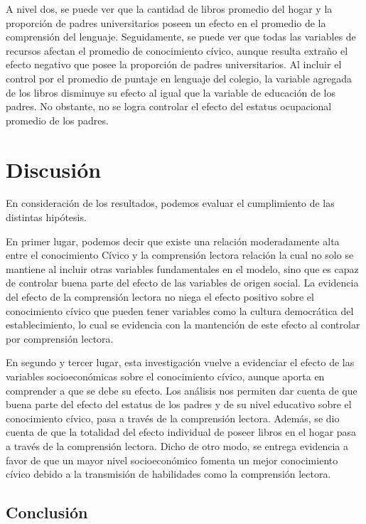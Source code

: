 \documentclass[12pt,twoside]{templates/facsothesis}
\begin{document}
A nivel dos, se puede ver que la cantidad de libros promedio del hogar y la proporción de padres universitarios poseen un efecto en el promedio de la comprensión del lenguaje. Seguidamente, se puede ver que todas las variables de recursos afectan el promedio de conocimiento cívico, aunque resulta extraño el efecto negativo que posee la proporción de padres universitarios. Al incluir el control por el promedio de puntaje en lenguaje del colegio, la variable agregada de los libros disminuye su efecto al igual que la variable de educación de los padres. No obstante, no se logra controlar el efecto del estatus ocupacional promedio de los padres.

\hypertarget{discusiuxf3n}{%
\chapter{Discusión}\label{discusiuxf3n}}

En consideración de los resultados, podemos evaluar el cumplimiento de las distintas hipótesis.

En primer lugar, podemos decir que existe una relación moderadamente alta entre el conocimiento Cívico y la comprensión lectora relación la cual no solo se mantiene al incluir otras variables fundamentales en el modelo, sino que es capaz de controlar buena parte del efecto de las variables de origen social. La evidencia del efecto de la comprensión lectora no niega el efecto positivo sobre el conocimiento cívico que pueden tener variables como la cultura democrática del establecimiento, lo cual se evidencia con la mantención de este efecto al controlar por comprensión lectora.

En segundo y tercer lugar, esta investigación vuelve a evidenciar el efecto de las variables socioeconómicas sobre el conocimiento cívico, aunque aporta en comprender a que se debe su efecto. Los análisis nos permiten dar cuenta de que buena parte del efecto del estatus de los padres y de su nivel educativo sobre el conocimiento cívico, pasa a través de la comprensión lectora. Además, se dio cuenta de que la totalidad del efecto individual de poseer libros en el hogar pasa a través de la comprensión lectora. Dicho de otro modo, se entrega evidencia a favor de que un mayor nivel socioeconómico fomenta un mejor conocimiento cívico debido a la transmisión de habilidades como la comprensión lectora.

\hypertarget{conclusiuxf3n}{%
\section{Conclusión}\label{conclusiuxf3n}}
\end{document}
